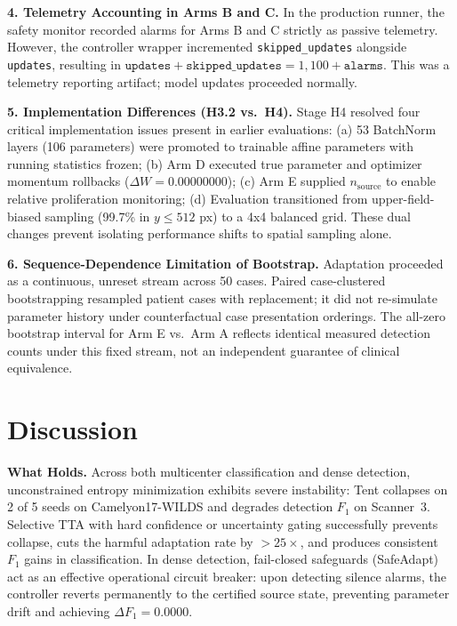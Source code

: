 \documentclass[conference]{IEEEtran}
\begin{document}
\textbf{4. Telemetry Accounting in Arms B and C.}
In the production runner, the safety monitor recorded alarms for Arms B and C strictly as passive telemetry.
However, the controller wrapper incremented \texttt{skipped\_updates} alongside \texttt{updates}, resulting in $\texttt{updates} + \texttt{skipped\_updates} = 1{,}100 + \texttt{alarms}$.
This was a telemetry reporting artifact; model updates proceeded normally.

\textbf{5. Implementation Differences (H3.2 vs.\ H4).}
Stage H4 resolved four critical implementation issues present in earlier evaluations:
(a) 53 BatchNorm layers (106 parameters) were promoted to trainable affine parameters with running statistics frozen;
(b) Arm D executed true parameter and optimizer momentum rollbacks ($\Delta W = 0.00000000$);
(c) Arm E supplied $n_{\mathrm{source}}$ to enable relative proliferation monitoring;
(d) Evaluation transitioned from upper-field-biased sampling (99.7\% in $y \le 512$ px) to a 4x4 balanced grid.
These dual changes prevent isolating performance shifts to spatial sampling alone.

\textbf{6. Sequence-Dependence Limitation of Bootstrap.}
Adaptation proceeded as a continuous, unreset stream across 50 cases.
Paired case-clustered bootstrapping resampled patient cases with replacement; it did not re-simulate parameter history under counterfactual case presentation orderings.
The all-zero bootstrap interval for Arm E vs.\ Arm A reflects identical measured detection counts under this fixed stream, not an independent guarantee of clinical equivalence.

\section{Discussion}
\textbf{What Holds.}
Across both multicenter classification and dense detection, unconstrained entropy minimization exhibits severe instability: Tent collapses on 2 of 5 seeds on Camelyon17-WILDS and degrades detection $F_1$ on Scanner~3.
Selective TTA with hard confidence or uncertainty gating successfully prevents collapse, cuts the harmful adaptation rate by $>25\times$, and produces consistent $F_1$ gains in classification.
In dense detection, fail-closed safeguards (SafeAdapt) act as an effective operational circuit breaker: upon detecting silence alarms, the controller reverts permanently to the certified source state, preventing parameter drift and achieving $\Delta F_1 = 0.0000$.
\end{document}
